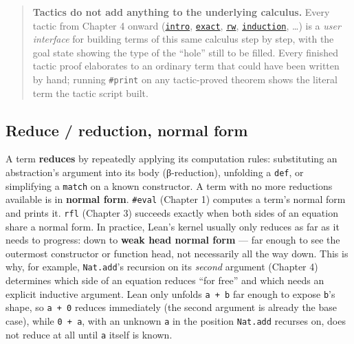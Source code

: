 \begin{quote}
\textbf{Tactics do not add anything to the underlying calculus.} Every tactic from Chapter 4 onward (\href{https://lean-lang.org/doc/reference/latest/Tactic-Proofs/Tactic-Reference/}{\texttt{intro}}, \href{https://lean-lang.org/doc/reference/latest/Tactic-Proofs/Tactic-Reference/}{\texttt{exact}}, \href{https://lean-lang.org/doc/reference/latest/Tactic-Proofs/Tactic-Reference/}{\texttt{rw}}, \href{https://lean-lang.org/doc/reference/latest/Tactic-Proofs/Tactic-Reference/}{\texttt{induction}}, \ldots) is a \emph{user interface} for building terms of this same calculus step by step, with the goal state showing the type of the ``hole'' still to be filled. Every finished tactic proof elaborates to an ordinary term that could have been written by hand; running \texttt{\#print} on any tactic-proved theorem shows the literal term the tactic script built.
\end{quote}

\subsection{Reduce / reduction, normal form}\label{sec:01-basics:04-terminology:5}

A term \textbf{reduces} by repeatedly applying its computation rules: substituting an abstraction's argument into its body (β-reduction), unfolding a \texttt{def}, or simplifying a \texttt{match} on a known constructor. A term with no more reductions available is in \textbf{normal form}. \texttt{\#eval} (Chapter 1) computes a term's normal form and prints it. \texttt{rfl} (Chapter 3) succeeds exactly when both sides of an equation share a normal form. In practice, Lean's kernel usually only reduces as far as it needs to progress: down to \textbf{weak head normal form} --- far enough to see the outermost constructor or function head, not necessarily all the way down. This is why, for example, \texttt{Nat.add}'s recursion on its \emph{second} argument (Chapter 4) determines which side of an equation reduces ``for free'' and which needs an explicit inductive argument. Lean only unfolds \texttt{a + b} far enough to expose \texttt{b}'s shape, so \texttt{a + 0} reduces immediately (the second argument is already the base case), while \texttt{0 + a}, with an unknown \texttt{a} in the position \texttt{Nat.add} recurses on, does not reduce at all until \texttt{a} itself is known.

